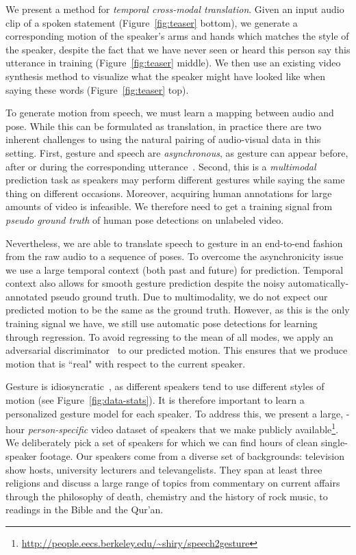 \documentclass[10pt,twocolumn,letterpaper]{article}
\begin{document}
We present a method for \emph{temporal cross-modal translation}. Given an input audio clip of a spoken statement (Figure~\ref{fig:teaser} bottom), we generate a corresponding motion of the speaker's arms and hands which matches the style of the speaker, despite the fact that we have never seen or heard this person say this utterance in training (Figure~\ref{fig:teaser} middle). We then use an existing video synthesis method to visualize what the speaker might have looked like when saying these words (Figure~\ref{fig:teaser} top).

To generate motion from speech, we must learn a mapping between audio and pose. While this can be formulated as translation, in practice there are two inherent challenges to using the natural pairing of audio-visual data in this setting. First, gesture and speech are 
\emph{asynchronous}, as gesture can appear before, after or during the corresponding utterance~\cite{Butterworth}. 
Second, this is a \emph{multimodal} prediction task as speakers may perform different gestures while saying the same thing on different occasions. Moreover, acquiring human annotations for large amounts of video is infeasible. We therefore need to get a training signal from \emph{pseudo ground truth} of  human pose detections on unlabeled video.

Nevertheless, we are able to translate speech to gesture in an end-to-end fashion from the
raw audio to a sequence of poses. To overcome the asynchronicity issue we use a large temporal context (both past and future) for prediction. Temporal context also allows for smooth gesture prediction despite the noisy automatically-annotated pseudo ground truth. Due to multimodality, we do not expect our predicted motion to be the same as the ground truth. However, as this is the only training signal we have, we still use automatic pose detections for learning through regression. To avoid regressing to the mean of all modes, we apply an adversarial discriminator~\cite{gan} to our predicted motion. This ensures that we produce motion that is ``real" with respect to the current speaker.

Gesture is idiosyncratic~\cite{McNeill92}, as different speakers tend to use different styles
of motion (see Figure~\ref{fig:data-stats}). It is therefore important to learn a personalized gesture model for each speaker. To address this, we present a large, -hour \textit{person-specific} video dataset of  speakers that we make publicly available\footnote{\url{http://people.eecs.berkeley.edu/~shiry/speech2gesture}}. We deliberately pick a set of speakers for which we can find hours of clean single-speaker footage. Our speakers come from a diverse set of backgrounds: television show hosts, university lecturers and televangelists. They span at least three religions and discuss a large range of topics from commentary on current affairs through the philosophy of death, chemistry and the history of rock music, to readings in the Bible and the Qur'an.
\end{document}
